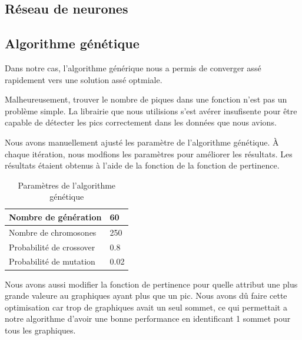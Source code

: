 \documentclass[12pt,letterpaper]{article}
\begin{document}
\subsection{Réseau de neurones} %

\subsection{Algorithme génétique}

Dans notre cas, l'algorithme générique nous a permis de converger assé rapidement vers une solution assé optmiale. 

Malheureusement, trouver le nombre de piques dans une fonction n'est pas un problème simple. La librairie que nous utilisions 
s'est avérer insufisente pour être capable de détecter les pics correctement dans les données que nous avions. 

Nous avons manuellement ajusté les paramètre de l'algorithme génétique. À chaque itération, nous modfions les paramètres pour 
améliorer les résultats. Les résultats étaient obtenus à l'aide de la fonction de la fonction de pertinence. 

\begin{table}[h]
  \begin{center}
    \begin{tabular} {|l|l|}
        \hline
        Nombre de génération & 60 \\
        \hline
        Nombre de chromosones & 250 \\
        \hline
        Probabilité de crossover & 0.8 \\
        \hline
        Probabilité de mutation & 0.02 \\
        \hline
    \end{tabular}
    \caption{Paramètres de l'algorithme génétique}
  \end{center}
\end{table}

Nous avons aussi modifier la fonction de pertinence pour quelle attribut une plus grande valeure au graphiques ayant plus que un pic. 
Nous avons dû faire cette optimisation car trop de graphiques avait un seul sommet, ce qui permettait a notre algorithme d'avoir une bonne
performance en identificant 1 sommet pour tous les graphiques.
\end{document}
